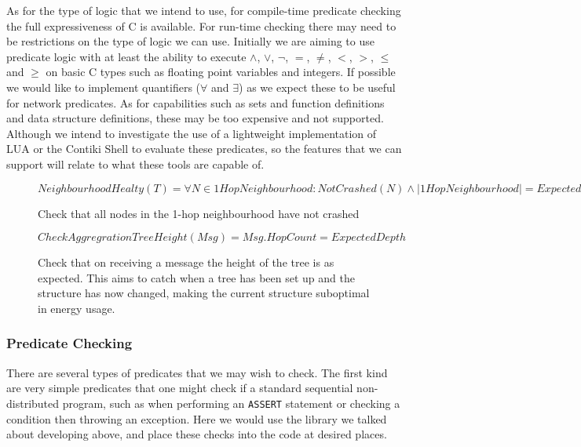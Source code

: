\documentclass[a4paper]{article}
\begin{document}
As for the type of logic that we intend to use, for compile-time predicate checking the full expressiveness of C is available. For run-time checking there may need to be restrictions on the type of logic we can use. Initially we are aiming to use predicate logic with at least the ability to execute $\land$, $\lor$, $\lnot$, $=$, $\neq$, $<$, $>$, $\leq$ and $\geq$ on basic C types such as floating point variables and integers. If possible we would like to implement quantifiers ($\forall$ and $\exists$) as we expect these to be useful for network predicates. As for capabilities such as sets and function definitions and data structure definitions, these may be too expensive and not supported. Although we intend to investigate the use of a lightweight implementation of LUA \cite{?} or the Contiki Shell \cite{?} to evaluate these predicates, so the features that we can support will relate to what these tools are capable of.

\begin{figure}[H]
\begin{center}
    \begin{displaymath}
	NeighbourhoodHealty(T) = \forall N \in 1HopNeighbourhood : NotCrashed(N) \land |1HopNeighbourhood| = Expected
	\end{displaymath}
	\caption{Check that all nodes in the 1-hop neighbourhood have not crashed}
\end{center}
\end{figure}

\begin{figure}[H]
\begin{center}
    \begin{displaymath}
	CheckAggregrationTreeHeight(Msg) = Msg.HopCount = ExpectedDepth
	\end{displaymath}
	\caption{Check that on receiving a message the height of the tree is as expected. This aims to catch when a tree has been set up and the structure has now changed, making the current structure suboptimal in energy usage.}
\end{center}
\end{figure}

\subsubsection{Predicate Checking}

There are several types of predicates that we may wish to check. The first kind are very simple predicates that one might check if a standard sequential non-distributed program, such as when performing an \verb|ASSERT| statement or checking a condition then throwing an exception. Here we would use the library we talked about developing above, and place these checks into the code at desired places.
\end{document}
